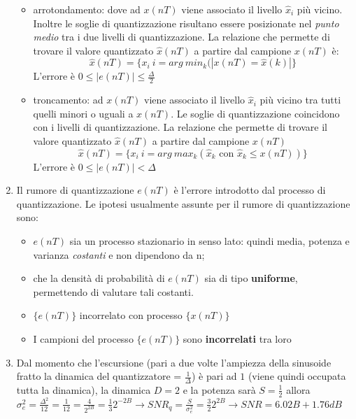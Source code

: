 \documentclass[
]{article}
\begin{document}
\begin{enumerate}
  \begin{itemize}
  \item
    arrotondamento: dove ad \(x(nT)\) viene associato il livello
    \(\hat{x}_i\) più vicino. Inoltre le soglie di quantizzazione
    risultano essere posizionate nel \emph{punto medio} tra i due
    livelli di quantizzazione. La relazione che permette di trovare il
    valore quantizzato \(\hat{x}(nT)\) a partire dal campione \(x(nT)\)
    è: \[
    \hat{x}(nT) = \{x_i \: i=arg \ min_k (|x(nT)=\hat{x}(k)| \}
    \] L'errore è \(0 \leq |e(nT)| \leq \frac{\Delta}{2}\)
  \item
    troncamento: ad \(x(nT)\) viene associato il livello \(\hat{x}_i\)
    più vicino tra tutti quelli minori o uguali a \(x(nT)\). Le soglie
    di quantizzazione coincidono con i livelli di quantizzazione. La
    relazione che permette di trovare il valore quantizzato
    \(\hat{x}(nT)\) a partire dal campione \(x(nT)\) \[
    \hat{x}(nT) = \{x_i \: i=arg \ max_k (\hat{x}_k \text{ con } \hat{x}_k \leq x(nT)) \}
    \] L'errore è \(0 \leq |e(nT)| < \Delta\)
  \end{itemize}
\item
  Il rumore di quantizzazione \(e(nT)\) è l'errore introdotto dal
  processo di quantizzazione. Le ipotesi usualmente assunte per il
  rumore di quantizzazione sono:

  \begin{itemize}
  \item
    \(e(nT)\) sia un processo stazionario in senso lato: quindi media,
    potenza e varianza \emph{costanti} e non dipendono da n;
  \item
    che la densità di probabilità di \(e(nT)\) sia di tipo
    \textbf{uniforme}, permettendo di valutare tali costanti.
  \item
    \(\{e(nT)\}\) incorrelato con processo \(\{x(nT)\}\)
  \item
    I campioni del processo \(\{e(nT)\}\) sono \textbf{incorrelati} tra
    loro
  \end{itemize}
\item
  Dal momento che l'escursione (pari a due volte l'ampiezza della
  sinusoide fratto la dinamica del quantizzatore = \(\frac{1}{\Delta}\))
  è pari ad \(1\) (viene quindi occupata tutta la dinamica), la dinamica
  \(D=2\) e la potenza sarà \(S=\frac{1}{2}\) allora
  \(\sigma^2_e = \frac{\Delta^2}{12}=\frac{1}{12} = \frac{4}{2^{2B}}=\frac{1}{3} 2^{-2B} \to SNR_q=\frac{S}{\sigma^2_e}=\frac{3}{2}2^{2B} \to SNR=6.02B+1.76dB\)
\end{enumerate}
\end{document}
